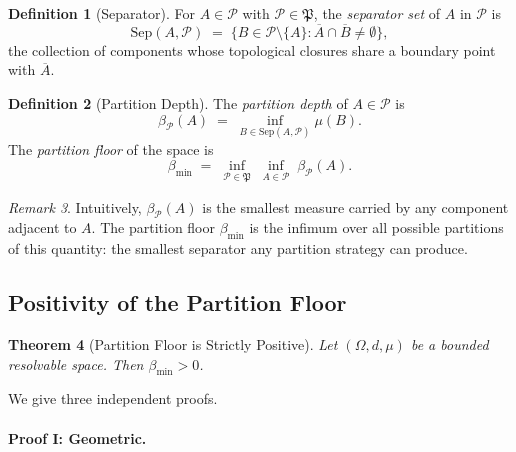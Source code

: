 \documentclass[12pt,a4paper,twocolumn]{article}
\theoremstyle{plain}
\newtheorem{theorem}{Theorem}[section]
\theoremstyle{definition}
\newtheorem{definition}[theorem]{Definition}
\theoremstyle{remark}
\newtheorem{remark}[theorem]{Remark}
\newcommand{\Part}{\mathcal{P}}
\newcommand{\Sep}{\mathrm{Sep}}
\newcommand{\bmin}{\beta_{\min}}
\newcommand{\bP}{\beta_{\mathcal{P}}}
\newcommand{\BRS}{(\Omega,d,\mu)}
\begin{document}
\begin{definition}[Separator]
\label{def:separator}
For $A \in \Part$ with $\Part \in \mathfrak{P}$, the \emph{separator set}
of $A$ in $\Part$ is
\begin{equation}
  \Sep(A, \Part) \;=\; \bigl\{ B \in \Part \setminus \{A\}
    : \overline{A} \cap \overline{B} \neq \emptyset \bigr\},
\end{equation}
the collection of components whose topological closures share a boundary
point with $\overline{A}$.
\end{definition}

\begin{definition}[Partition Depth]
\label{def:partition-depth}
The \emph{partition depth} of $A \in \Part$ is
\begin{equation}
  \bP(A) \;=\; \inf_{B \in \Sep(A,\Part)} \mu(B).
\end{equation}
The \emph{partition floor} of the space is
\begin{equation}
  \bmin \;=\; \inf_{\Part \in \mathfrak{P}}\; \inf_{A \in \Part}\; \bP(A).
\end{equation}
\end{definition}

\begin{remark}
Intuitively, $\bP(A)$ is the smallest measure carried by any component
adjacent to $A$.  The partition floor $\bmin$ is the infimum over all possible
partitions of this quantity: the smallest separator any partition strategy can
produce.
\end{remark}

\subsection{Positivity of the Partition Floor}

\begin{theorem}[Partition Floor is Strictly Positive]
\label{thm:floor-positive}
Let $\BRS$ be a bounded resolvable space.  Then $\bmin > 0$.
\end{theorem}

We give three independent proofs.

\paragraph{Proof I: Geometric.}
\end{document}
